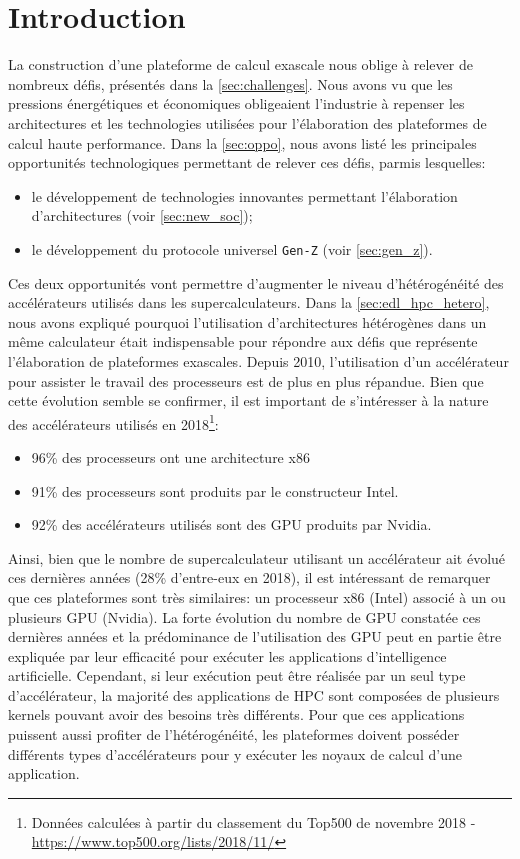 \section{Introduction}\label{sec:methodo_intro}

        La construction d'une plateforme de calcul \gls{exascale} nous oblige à relever de nombreux défis, présentés dans la \autoref{sec:challenges}. Nous avons vu que les pressions énergétiques et économiques obligeaient l'industrie à repenser les architectures et les technologies utilisées pour l'élaboration des plateformes de calcul haute performance. Dans la \autoref{sec:oppo}, nous avons listé les principales opportunités technologiques permettant de relever ces défis, parmis lesquelles:
        \begin{itemize} 
            \item le développement de technologies innovantes permettant l'élaboration d'architectures (voir \autoref{sec:new_soc});
            \item le développement du protocole universel \verb|Gen-Z| (voir \autoref{sec:gen_z}).
        \end{itemize}
        Ces deux opportunités vont permettre d'augmenter le niveau d'hétérogénéité des accélérateurs utilisés dans les supercalculateurs. Dans la \autoref{sec:edl_hpc_hetero}, nous avons expliqué pourquoi l'utilisation d'architectures hétérogènes dans un même calculateur était indispensable pour répondre aux défis que représente l'élaboration de plateformes \glspl{exascale}. Depuis 2010, l'utilisation d'un accélérateur pour assister le travail des processeurs est de plus en plus répandue. Bien que cette évolution semble se confirmer, il est important de s'intéresser à la nature des accélérateurs utilisés en 2018\footnote{Données calculées à partir du classement du Top500 de novembre 2018 - \url{https://www.top500.org/lists/2018/11/}}:
        \begin{itemize}
            \item 96\% des processeurs ont une architecture x86
            \item 91\% des processeurs sont produits par le constructeur Intel.
            \item 92\% des accélérateurs utilisés sont des GPU produits par Nvidia. 
        \end{itemize}
        Ainsi, bien que le nombre de supercalculateur utilisant un accélérateur ait évolué ces dernières années (28\% d'entre-eux en 2018), il est intéressant de remarquer que ces plateformes sont très similaires: un processeur x86 (Intel) associé à un ou plusieurs GPU (Nvidia). La forte évolution du nombre de GPU constatée ces dernières années et la prédominance de l'utilisation des \gls{GPU} peut en partie être expliquée par leur efficacité pour exécuter les applications d'intelligence artificielle. Cependant, si leur exécution peut être réalisée par un seul type d'accélérateur, la majorité des applications de HPC sont composées de plusieurs \glspl{kernel} pouvant avoir des besoins très différents. Pour que ces applications puissent aussi profiter de l'hétérogénéité, les plateformes doivent posséder différents types d'accélérateurs pour y exécuter les noyaux de calcul d'une application.
